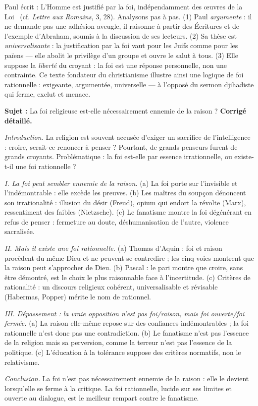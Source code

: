 \documentclass[11pt]{article}
\begin{document}
\begin{experience}
Paul écrit : \guillemotleft L'Homme est justifié par la foi, indépendamment des œuvres de la Loi \guillemotright\ (cf. \emph{Lettre aux Romains}, 3, 28). Analysons pas à pas. (1) Paul \emph{argumente} : il ne demande pas une adhésion aveugle, il raisonne à partir des Écritures et de l'exemple d'Abraham, soumis à la discussion de ses lecteurs. (2) Sa thèse est \emph{universalisante} : la justification par la foi vaut pour les Juifs comme pour les païens — elle abolit le privilège d'un groupe et ouvre le salut à tous. (3) Elle suppose la \emph{liberté} du croyant : la foi est une réponse personnelle, non une contrainte. Ce texte fondateur du christianisme illustre ainsi une logique de foi rationnelle : exigeante, argumentée, universelle — à l'opposé du sermon djihadiste qui ferme, exclut et menace.
\end{experience}

\begin{exoresolu}
\textbf{Sujet :} La foi religieuse est-elle nécessairement ennemie de la raison ?
\tcblower
\textbf{Corrigé détaillé.}

\emph{Introduction.} La religion est souvent accusée d'exiger un sacrifice de l'intelligence : croire, serait-ce renoncer à penser ? Pourtant, de grands penseurs furent de grands croyants. Problématique : la foi est-elle par essence irrationnelle, ou existe-t-il une foi rationnelle ?

\emph{I. La foi peut sembler ennemie de la raison.} (a) La foi porte sur l'invisible et l'indémontrable : elle excède les preuves. (b) Les maîtres du soupçon dénoncent son irrationalité : illusion du désir (Freud), opium qui endort la révolte (Marx), ressentiment des faibles (Nietzsche). (c) Le fanatisme montre la foi dégénérant en refus de penser : fermeture au doute, déshumanisation de l'autre, violence sacralisée.

\emph{II. Mais il existe une foi rationnelle.} (a) Thomas d'Aquin : foi et raison procèdent du même Dieu et ne peuvent se contredire ; les cinq voies montrent que la raison peut s'approcher de Dieu. (b) Pascal : le pari montre que croire, sans être démontré, est le choix le plus raisonnable face à l'incertitude. (c) Critères de rationalité : un discours religieux cohérent, universalisable et révisable (Habermas, Popper) mérite le nom de rationnel.

\emph{III. Dépassement : la vraie opposition n'est pas foi/raison, mais foi ouverte/foi fermée.} (a) La raison elle-même repose sur des confiances indémontrables ; la foi rationnelle n'est donc pas une contradiction. (b) Le fanatisme n'est pas l'essence de la religion mais sa perversion, comme la terreur n'est pas l'essence de la politique. (c) L'éducation à la tolérance suppose des critères normatifs, non le relativisme.

\emph{Conclusion.} La foi n'est pas nécessairement ennemie de la raison : elle le devient lorsqu'elle se ferme à la critique. La foi rationnelle, lucide sur ses limites et ouverte au dialogue, est le meilleur rempart contre le fanatisme.
\end{exoresolu}
\end{document}
